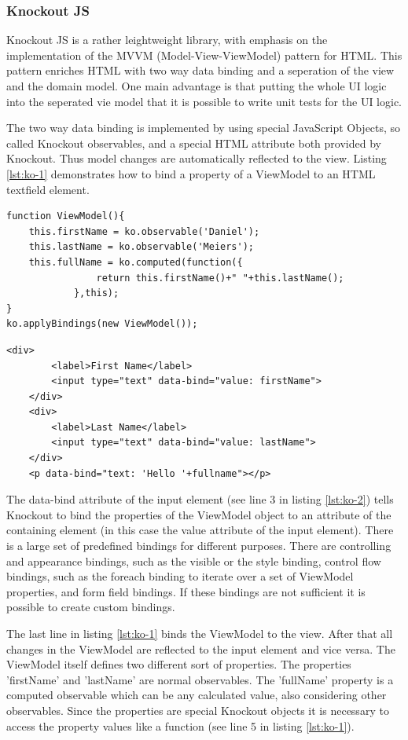 \subsubsection{Knockout JS}

Knockout JS is a rather leightweight library, with emphasis on the implementation of the MVVM (Model-View-ViewModel) pattern for HTML.
This pattern enriches HTML with two way data binding and a seperation of the view and the domain model. One main advantage is that putting the whole UI logic into the seperated vie model that it is possible to write unit tests for the UI logic.

The two way data binding is implemented by using special JavaScript Objects, so called Knockout observables, and a special HTML attribute both provided by Knockout.
Thus model changes are automatically reflected to the view.
Listing \ref{lst:ko-1} demonstrates how to bind a property of a ViewModel to an HTML textfield element.

\begin{lstlisting}[label=lst:ko-1,caption=the ViewModel]
function ViewModel(){
	this.firstName = ko.observable('Daniel');
	this.lastName = ko.observable('Meiers');
	this.fullName = ko.computed(function({
				return this.firstName()+" "+this.lastName();
			},this); 
}
ko.applyBindings(new ViewModel());
\end{lstlisting}

\begin{lstlisting}[label=lst:ko-2,caption=the html view]
 	<div>
		<label>First Name</label> 
		<input type="text" data-bind="value: firstName">
	</div>
	<div>
		<label>Last Name</label> 
		<input type="text" data-bind="value: lastName">
	</div>
	<p data-bind="text: 'Hello '+fullname"></p>
\end{lstlisting}

The data-bind attribute of the input element (see line 3 in listing \ref{lst:ko-2}) tells Knockout to bind the properties of the ViewModel object to an attribute of the containing element (in this case the value attribute of the input element).
There is a large set of predefined bindings for different purposes.
There are controlling and appearance bindings, such as the visible or the style binding, control flow bindings, such as the foreach binding to iterate over a set of ViewModel properties, and form field bindings.
If these bindings are not sufficient it is possible to create custom bindings.

The last line in listing \ref{lst:ko-1} binds the ViewModel to the view.
After that all changes in the ViewModel are reflected to the input element and vice versa.
The ViewModel itself defines two different sort of properties.
The properties 'firstName' and 'lastName' are normal observables.
The 'fullName' property is a computed observable which can be any calculated value, also considering other observables.
Since the properties are special Knockout objects it is necessary to access the property values like a function (see line 5 in listing \ref{lst:ko-1}).

